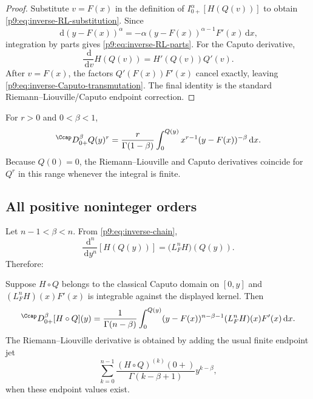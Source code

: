 \documentclass[11pt,oneside]{article}
\theoremstyle{definition}
\theoremstyle{remark}
\newcommand{\dd}{\,\mathrm d}
\newcommand{\1}{\mathbf 1}
\begin{document}
\begin{proof}
Substitute $v=F(x)$ in the definition of $I_{0+}^\alpha[H(Q(v))]$ to obtain
\cref{p9:eq:inverse-RL-substitution}.  Since
\[
 \dd (y-F(x))^\alpha
 =-\alpha(y-F(x))^{\alpha-1}F'(x)\dd x,
\]
integration by parts gives \cref{p9:eq:inverse-RL-parts}.
For the Caputo derivative,
\[
 \frac{\dd}{\dd v}H(Q(v))=H'(Q(v))Q'(v).
\]
After $v=F(x)$, the factors $Q'(F(x))F'(x)$ cancel exactly, leaving
\cref{p9:eq:inverse-Caputo-transmutation}.  The final identity is the standard
Riemann--Liouville/Caputo endpoint correction.
\end{proof}

\begin{corollary}
For $r>0$ and $0<\beta<1$,
\begin{equation}
 {}^{\Ccap}D_{0+}^\beta Q(y)^r
 =\frac{r}{\Gamma(1-\beta)}
   \int_0^{Q(y)}x^{r-1}(y-F(x))^{-\beta}\dd x.
 \label{p9:eq:Caputo-Q-power}
\end{equation}
Because $Q(0)=0$, the Riemann--Liouville and Caputo derivatives coincide for
$Q^r$ in this range whenever the integral is finite.
\end{corollary}

\subsection{All positive noninteger orders}

Let $n-1<\beta<n$.  From \cref{p9:eq:inverse-chain},
\begin{equation}
 \frac{\dd^n}{\dd y^n}[H(Q(y))]
 =\bigl(L_F^nH\bigr)(Q(y)).
\end{equation}
Therefore:

\begin{proposition}
Suppose $H\circ Q$ belongs to the classical Caputo domain on $[0,y]$ and
$(L_F^nH)(x)F'(x)$ is integrable against the displayed kernel.  Then
\begin{equation}
 {}^{\Ccap}D_{0+}^\beta[H\circ Q](y)
 =\frac1{\Gamma(n-\beta)}
  \int_0^{Q(y)}(y-F(x))^{n-\beta-1}
  (L_F^nH)(x)F'(x)\dd x.
 \label{p9:eq:higher-Caputo-transmutation}
\end{equation}
The Riemann--Liouville derivative is obtained by adding the usual finite
endpoint jet
\begin{equation}
 \sum_{k=0}^{n-1}
 \frac{(H\circ Q)^{(k)}(0+)}{\Gamma(k-\beta+1)}y^{k-\beta},
 \label{p9:eq:higher-RL-jet}
\end{equation}
when these endpoint values exist.
\end{proposition}
\end{document}
